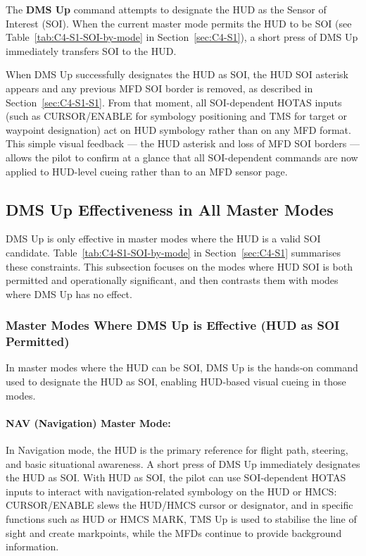 \documentclass[11pt, a4paper, twoside]{report}
\begin{document}
The \textbf{DMS Up} command attempts to designate the HUD as the Sensor of Interest (SOI). When the current master mode permits the HUD to be SOI (see Table~\ref{tab:C4-S1-SOI-by-mode} in Section~\ref{sec:C4-S1}), a short press of DMS Up immediately transfers SOI to the HUD.

When DMS Up successfully designates the HUD as SOI, the HUD SOI asterisk appears and any previous MFD SOI border is removed, as described in Section~\ref{sec:C4-S1-S1}. From that moment, all SOI-dependent HOTAS inputs (such as CURSOR/ENABLE for symbology positioning and TMS for target or waypoint designation) act on HUD symbology rather than on any MFD format. This simple visual feedback --- the HUD asterisk and loss of MFD SOI borders --- allows the pilot to confirm at a glance that all SOI-dependent commands are now applied to HUD-level cueing rather than to an MFD sensor page.

\subsection{DMS Up Effectiveness in All Master Modes}
\label{sec:C4-S2-S1}

DMS Up is only effective in master modes where the HUD is a valid SOI candidate. Table~\ref{tab:C4-S1-SOI-by-mode} in Section~\ref{sec:C4-S1} summarises these constraints. This subsection focuses on the modes where HUD SOI is both permitted and operationally significant, and then contrasts them with modes where DMS Up has no effect.

\subsubsection{Master Modes Where DMS Up is Effective (HUD as SOI Permitted)}
\label{sec:C4-S2-S1-S1}

In master modes where the HUD can be SOI, DMS Up is the hands‑on command used to designate the HUD as SOI, enabling HUD‑based visual cueing in those modes.

\paragraph*{NAV (Navigation) Master Mode:}
In Navigation mode, the HUD is the primary reference for flight path, steering, and basic situational awareness. A short press of DMS Up immediately designates the HUD as SOI. With HUD as SOI, the pilot can use SOI‑dependent HOTAS inputs to interact with navigation‑related symbology on the HUD or HMCS: CURSOR/ENABLE slews the HUD/HMCS cursor or designator, and in specific functions such as HUD or HMCS MARK, TMS Up is used to stabilise the line of sight and create markpoints, while the MFDs continue to provide background information.
\end{document}

